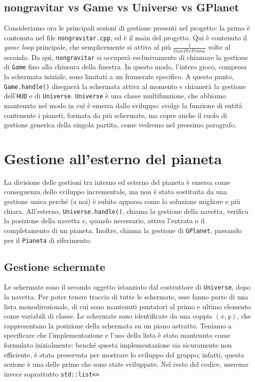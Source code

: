 \documentclass{article}
\begin{document}
\subsection{nongravitar vs Game vs Universe vs GPlanet}
Consideriamo ora le principali sezioni di gestione presenti nel progetto: la prima è contenuta nel file \lstinline{nongravitar.cpp}, ed è il main del progetto. Qui è contenuto il \textit{game loop} principale, che semplicemente si attiva al più $\frac{1}{timePerFrame}$ volte al secondo. Da qui, \lstinline{nongravitar} si occuperà esclusivamente di chiamare la gestione di \lstinline{Game} fino alla chiusura della finestra. In questo modo, l'intero gioco, compresa la schermata iniziale, sono limitati a un framerate specifico. A questo punto, \lstinline{Game.handle()} disegnerà la schermata attiva al momento e chiamerà la gestione dell'\lstinline{HUD} e di \lstinline{Universe}.\medskip \newline
\lstinline{Universe} è una classe multifunzione, che abbiamo mantenuto nel modo in cui è emersa dallo sviluppo: svolge la funzione di entità contenente i pianeti, formata da più schermate, ma copre anche il ruolo di gestione generica della singola partita, come vedremo nel prossimo paragrafo.
\section{Gestione all'esterno del pianeta}
La divisione delle gestioni tra interno ed esterno del pianeta è emersa come conseguenza dello sviluppo incrementale, ma non è stata sostituita da una gestione unica perché (a noi) è subito apparsa come la soluzione migliore e più chiara. All'esterno, \lstinline{Universe.handle()}, chiama la gestione della navetta, verifica la posizione della navetta e, quando necessario, attiva l'entrata o il completamento di un pianeta. Inoltre, chiama la gestione di \lstinline{GPlanet}, passando per il \lstinline{Pianeta} di riferimento.
\subsection{Gestione schermate}
Le schermate sono il secondo oggetto istanziato dal costruttore di \lstinline{Universe}, dopo la navetta. Per poter tenere traccia di tutte le schermate, esse fanno parte di una lista monodirezionale, di cui sono mantenuti puntatori al primo e ultimo elemento come variabili di classe. Le schermate sono identificate da una coppia $(x,y)$, che rappresentano la posizione della schermata su un piano astratto. Teniamo a specificare che l'implementazione e l'uso della lista è stato mantenuto come formulato inizialmente: benché questa implementazione sia sicuramente non efficiente, è stata preservata per mostrare lo sviluppo del gruppo; infatti, questa sezione è una delle prime che sono state sviluppate. Nel resto del codice, useremo invece soprattutto \lstinline{std::list<>}
\end{document}
